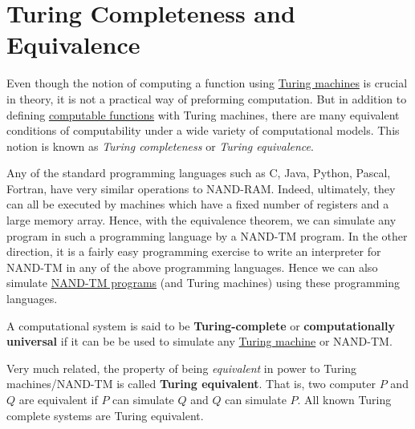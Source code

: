 \section{Turing Completeness and Equivalence}

  Even though the notion of computing a function using \hyperref[def:turing-machine]{Turing machines} is crucial in theory, it is not a practical way of preforming computation. But in addition to defining \hyperref[def:computable-functions]{computable functions} with Turing machines, there are many equivalent conditions of computability under a wide variety of computational models. This notion is known as \textit{Turing completeness} or \textit{Turing equivalence}. 

  Any of the standard programming languages such as C, Java, Python, Pascal, Fortran, have very similar operations to NAND-RAM. Indeed, ultimately, they can all be executed by machines which have a fixed number of registers and a large memory array. Hence, with the equivalence theorem, we can simulate any program in such a programming language by a NAND-TM program. In the other direction, it is a fairly easy programming exercise to write an interpreter for NAND-TM in any of the above programming languages. Hence we can also simulate \hyperref[def:nand-tm-programs]{NAND-TM programs} (and Turing machines) using these programming languages. 

  \begin{definition}
    \label{def:turing-complete}
  A computational system is said to be \textbf{Turing-complete} or \textbf{computationally universal} if it can be be used to simulate any \hyperref[def:turing-machine]{Turing machine} or NAND-TM. 

  Very much related, the property of being \textit{equivalent} in power to Turing machines/NAND-TM is called \textbf{Turing equivalent}. That is, two computer $P$ and $Q$ are equivalent if $P$ can simulate $Q$ and $Q$ can simulate $P$. All known Turing complete systems are Turing equivalent. 
  \end{definition}

